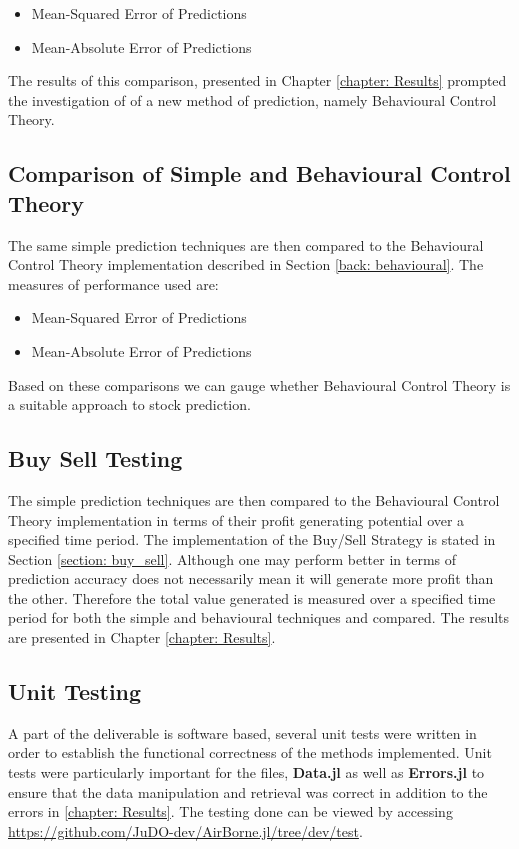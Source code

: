 \begin{itemize}
    \item Mean-Squared Error of Predictions
    \item Mean-Absolute Error of Predictions
\end{itemize}

\noindent The results of this comparison, presented in Chapter \ref{chapter: Results} prompted the investigation of of a new method of prediction, namely Behavioural Control Theory.

\subsection{Comparison of Simple and Behavioural Control Theory}

The same simple prediction techniques are then compared to the Behavioural Control Theory implementation described in Section \ref{back: behavioural}. The measures of performance used are:

\begin{itemize}
    \item Mean-Squared Error of Predictions
    \item Mean-Absolute Error of Predictions
\end{itemize}

\noindent Based on these comparisons we can gauge whether Behavioural Control Theory is a suitable approach to stock prediction. 

\clearpage

\subsection{Buy Sell Testing}

The simple prediction techniques are then compared to the Behavioural Control Theory implementation in terms of their profit generating potential over a specified time period. The implementation of the Buy/Sell Strategy is stated in Section \ref{section: buy_sell}. Although one may perform better in terms of prediction accuracy does not necessarily mean it will generate more profit than the other. Therefore the total value generated is measured over a specified time period for both the simple and behavioural techniques and compared. The results are presented in Chapter \ref{chapter: Results}.

\subsection{Unit Testing}
A part of the deliverable is software based, several unit tests were written in order to establish the functional correctness of the methods implemented. Unit tests were particularly important for the files, \textbf{Data.jl} as well as \textbf{Errors.jl} to ensure that the data manipulation and retrieval was correct in addition to the errors in \ref{chapter: Results}. The testing done can be viewed by accessing \hyperlink{}{https://github.com/JuDO-dev/AirBorne.jl/tree/dev/test}.






